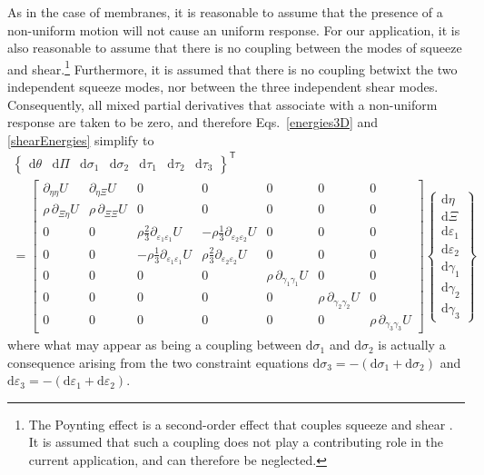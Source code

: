 As in the case of membranes, it is reasonable to assume that the presence of a non-uniform motion will not cause an uniform response.  For our application, it is also reasonable to assume that there is no coupling between the modes of squeeze and shear.\footnote{
   The Poynting effect is a second-order effect that couples squeeze and shear \cite{FreedZamani19}.  It is assumed that such a coupling does not play a contributing role in the current application, and can therefore be neglected.
}
Furthermore, it is assumed that there is no coupling betwixt the two independent squeeze modes, nor between the three independent shear modes.  Consequently, all mixed partial derivatives that associate with a non-uniform response are taken to be zero, and therefore Eqs.~\ref{energies3D} and \ref{shearEnergies} simplify to
\footnotesize
\begin{multline*}
\left\{ \begin{matrix}
\mathrm{d} \theta & \mathrm{d} \Pi &
\mathrm{d} \sigma_1 & \mathrm{d} \sigma_2 &
\mathrm{d} \tau_1 & \mathrm{d} \tau_2 & \mathrm{d} \tau_3
\end{matrix} \right\}^{\mathsf{T}} \\ = \begin{bmatrix}
\partial_{\eta\eta} U & \partial_{\eta\Xi} U & 0 & 0 & 0 & 0 & 0 \\
\rho \, \partial_{\Xi\eta} U & \rho \, \partial_{\Xi\Xi} U & 0 & 0 & 0 & 0 & 0 \\
0 & 0 & \rho \tfrac{2}{3} \partial_{\varepsilon_1 \varepsilon_1} U & -\rho \tfrac{1}{3} \partial_{\varepsilon_2 \varepsilon_2} U & 0 & 0 & 0 \\
0 & 0 & -\rho \tfrac{1}{3} \partial_{\varepsilon_1 \varepsilon_1} U & \rho \tfrac{2}{3} \partial_{\varepsilon_2 \varepsilon_2} U & 0 & 0 & 0 \\
0 & 0 & 0 & 0 & \rho \, \partial_{\gamma_1\gamma_1} U & 0 & 0 \\
0 & 0 & 0 & 0 & 0 & \rho \, \partial_{\gamma_2\gamma_2} U & 0 \\
0 & 0 & 0 & 0 & 0 & 0 & \rho \, \partial_{\gamma_3\gamma_3} U
\end{bmatrix}
\left\{ \begin{matrix}
\mathrm{d}\eta \\ \mathrm{d} \Xi \\
\mathrm{d} \varepsilon_1 \\ \mathrm{d} \varepsilon_2 \\
\mathrm{d} \gamma_1 \\ \mathrm{d} \gamma_2 \\ \mathrm{d} \gamma_3
\end{matrix} \right\}
\end{multline*}
\normalsize
where what may appear as being a coupling between $\mathrm{d} \sigma_1$ and $\mathrm{d} \sigma_2$ is actually a consequence arising from the two constraint equations $\mathrm{d} \sigma_3 = -( \mathrm{d} \sigma_1 + \mathrm{d} \sigma_2 )$ and $\mathrm{d} \varepsilon_3 = -( \mathrm{d} \varepsilon_1 + \mathrm{d} \varepsilon_2 )$.

